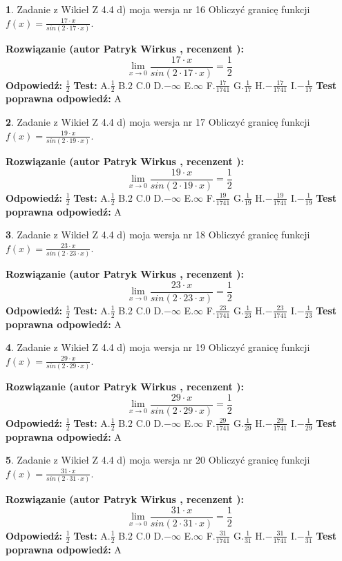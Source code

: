 \documentclass[12pt, a4paper]{article}
\theoremstyle{definition} %
\newtheorem{zad}{}
\newcommand{\zadStart}[1]{\begin{zad}#1\newline}
\newcommand{\zadStop}{\end{zad}}
\newcommand{\rozwStart}[2]{\noindent \textbf{Rozwiązanie (autor #1 , recenzent #2): }\newline}
\newcommand{\rozwStop}{\newline}
\newcommand{\odpStart}{\noindent \textbf{Odpowiedź:}\newline}
\newcommand{\odpStop}{\newline}
\newcommand{\testStart}{\noindent \textbf{Test:}\newline}
\newcommand{\testStop}{\newline}
\newcommand{\kluczStart}{\noindent \textbf{Test poprawna odpowiedź:}\newline}
\newcommand{\kluczStop}{\newline}
\begin{document}
\zadStart{Zadanie z Wikieł Z 4.4 d) moja wersja nr 16}
Obliczyć granicę funkcji $f(x)=\frac{17\cdot x}{sin(2 \cdot17\cdot x)}$.
\zadStop
\rozwStart{Patryk Wirkus}{}
$$\lim\limits_{x\to 0}\frac{17\cdot x}{sin(2 \cdot17\cdot x)}=\frac{1}{2}$$
\rozwStop
\odpStart
$\frac{1}{2}$
\odpStop
\testStart
A.$\frac{1}{2}$
B.$2$
C.$0$
D.$-\infty$
E.$\infty$
F.$\frac{17}{1741}$
G.$\frac{1}{17}$
H.$-\frac{17}{1741}$
I.$-\frac{1}{17}$
\testStop
\kluczStart
A
\kluczStop



\zadStart{Zadanie z Wikieł Z 4.4 d) moja wersja nr 17}
Obliczyć granicę funkcji $f(x)=\frac{19\cdot x}{sin(2 \cdot19\cdot x)}$.
\zadStop
\rozwStart{Patryk Wirkus}{}
$$\lim\limits_{x\to 0}\frac{19\cdot x}{sin(2 \cdot19\cdot x)}=\frac{1}{2}$$
\rozwStop
\odpStart
$\frac{1}{2}$
\odpStop
\testStart
A.$\frac{1}{2}$
B.$2$
C.$0$
D.$-\infty$
E.$\infty$
F.$\frac{19}{1741}$
G.$\frac{1}{19}$
H.$-\frac{19}{1741}$
I.$-\frac{1}{19}$
\testStop
\kluczStart
A
\kluczStop



\zadStart{Zadanie z Wikieł Z 4.4 d) moja wersja nr 18}
Obliczyć granicę funkcji $f(x)=\frac{23\cdot x}{sin(2 \cdot23\cdot x)}$.
\zadStop
\rozwStart{Patryk Wirkus}{}
$$\lim\limits_{x\to 0}\frac{23\cdot x}{sin(2 \cdot23\cdot x)}=\frac{1}{2}$$
\rozwStop
\odpStart
$\frac{1}{2}$
\odpStop
\testStart
A.$\frac{1}{2}$
B.$2$
C.$0$
D.$-\infty$
E.$\infty$
F.$\frac{23}{1741}$
G.$\frac{1}{23}$
H.$-\frac{23}{1741}$
I.$-\frac{1}{23}$
\testStop
\kluczStart
A
\kluczStop



\zadStart{Zadanie z Wikieł Z 4.4 d) moja wersja nr 19}
Obliczyć granicę funkcji $f(x)=\frac{29\cdot x}{sin(2 \cdot29\cdot x)}$.
\zadStop
\rozwStart{Patryk Wirkus}{}
$$\lim\limits_{x\to 0}\frac{29\cdot x}{sin(2 \cdot29\cdot x)}=\frac{1}{2}$$
\rozwStop
\odpStart
$\frac{1}{2}$
\odpStop
\testStart
A.$\frac{1}{2}$
B.$2$
C.$0$
D.$-\infty$
E.$\infty$
F.$\frac{29}{1741}$
G.$\frac{1}{29}$
H.$-\frac{29}{1741}$
I.$-\frac{1}{29}$
\testStop
\kluczStart
A
\kluczStop



\zadStart{Zadanie z Wikieł Z 4.4 d) moja wersja nr 20}
Obliczyć granicę funkcji $f(x)=\frac{31\cdot x}{sin(2 \cdot31\cdot x)}$.
\zadStop
\rozwStart{Patryk Wirkus}{}
$$\lim\limits_{x\to 0}\frac{31\cdot x}{sin(2 \cdot31\cdot x)}=\frac{1}{2}$$
\rozwStop
\odpStart
$\frac{1}{2}$
\odpStop
\testStart
A.$\frac{1}{2}$
B.$2$
C.$0$
D.$-\infty$
E.$\infty$
F.$\frac{31}{1741}$
G.$\frac{1}{31}$
H.$-\frac{31}{1741}$
I.$-\frac{1}{31}$
\testStop
\kluczStart
A
\kluczStop
\end{document}
